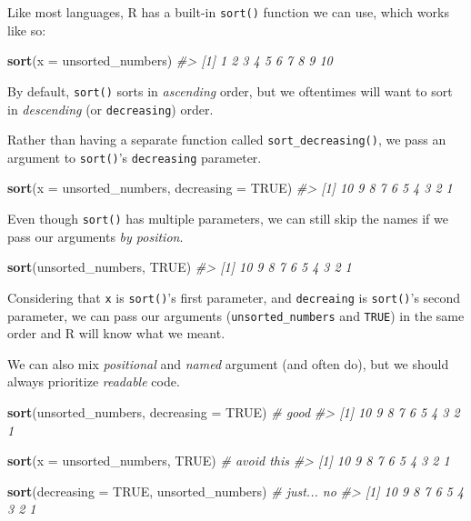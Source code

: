 \documentclass[
]{report}
\newenvironment{Shaded}{\begin{snugshade}}{\end{snugshade}}
\newcommand{\CommentTok}[1]{\textcolor[rgb]{0.56,0.35,0.01}{\textit{#1}}}
\newcommand{\DataTypeTok}[1]{\textcolor[rgb]{0.13,0.29,0.53}{#1}}
\newcommand{\KeywordTok}[1]{\textcolor[rgb]{0.13,0.29,0.53}{\textbf{#1}}}
\newcommand{\NormalTok}[1]{#1}
\newcommand{\OtherTok}[1]{\textcolor[rgb]{0.56,0.35,0.01}{#1}}
\begin{document}
Like most languages, R has a built-in \texttt{sort()} function we can use, which works like so:

\begin{Shaded}
\begin{Highlighting}[]
\KeywordTok{sort}\NormalTok{(}\DataTypeTok{x =}\NormalTok{ unsorted\_numbers)}
\CommentTok{\#\textgreater{}  [1]  1  2  3  4  5  6  7  8  9 10}
\end{Highlighting}
\end{Shaded}

By default, \texttt{sort()} sorts in \emph{ascending} order, but we oftentimes will want to sort in \emph{descending} (or \texttt{decreasing}) order.

Rather than having a separate function called \texttt{sort\_decreasing()}, we pass an argument to \texttt{sort()}'s \texttt{decreasing} parameter.

\begin{Shaded}
\begin{Highlighting}[]
\KeywordTok{sort}\NormalTok{(}\DataTypeTok{x =}\NormalTok{ unsorted\_numbers, }\DataTypeTok{decreasing =} \OtherTok{TRUE}\NormalTok{)}
\CommentTok{\#\textgreater{}  [1] 10  9  8  7  6  5  4  3  2  1}
\end{Highlighting}
\end{Shaded}

Even though \texttt{sort()} has multiple parameters, we can still skip the names if we pass our arguments \emph{by position}.

\begin{Shaded}
\begin{Highlighting}[]
\KeywordTok{sort}\NormalTok{(unsorted\_numbers, }\OtherTok{TRUE}\NormalTok{)}
\CommentTok{\#\textgreater{}  [1] 10  9  8  7  6  5  4  3  2  1}
\end{Highlighting}
\end{Shaded}

Considering that \texttt{x} is \texttt{sort()}'s first parameter, and \texttt{decreaing} is \texttt{sort()}'s second parameter, we can pass our arguments (\texttt{unsorted\_numbers} and \texttt{TRUE}) in the same order and R will know what we meant.

We can also mix \emph{positional} and \emph{named} argument (and often do), but we should always prioritize \emph{readable} code.

\begin{Shaded}
\begin{Highlighting}[]
\KeywordTok{sort}\NormalTok{(unsorted\_numbers, }\DataTypeTok{decreasing =} \OtherTok{TRUE}\NormalTok{) }\CommentTok{\# good}
\CommentTok{\#\textgreater{}  [1] 10  9  8  7  6  5  4  3  2  1}

\KeywordTok{sort}\NormalTok{(}\DataTypeTok{x =}\NormalTok{ unsorted\_numbers, }\OtherTok{TRUE}\NormalTok{)          }\CommentTok{\# avoid this}
\CommentTok{\#\textgreater{}  [1] 10  9  8  7  6  5  4  3  2  1}

\KeywordTok{sort}\NormalTok{(}\DataTypeTok{decreasing =} \OtherTok{TRUE}\NormalTok{, unsorted\_numbers) }\CommentTok{\# just... no}
\CommentTok{\#\textgreater{}  [1] 10  9  8  7  6  5  4  3  2  1}
\end{Highlighting}
\end{Shaded}
\end{document}
